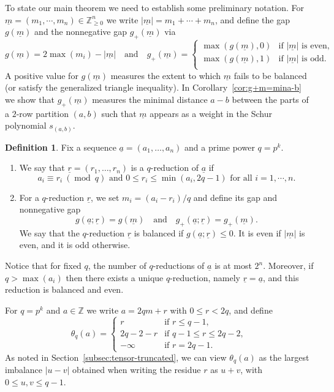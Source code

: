 \documentclass[11pt,reqno]{amsart}
\newcommand{\defi}[1]{{\upshape\sffamily #1}}
\newcommand{\bb}[1]{\mathbb{#1}}
\newcommand{\op}[1]{\operatorname{#1}}
\newcommand{\ul}[1]{\underline{#1}}
\theoremstyle{definition}
\newtheorem{definition}[theorem]{Definition}
\theoremstyle{remark}
\numberwithin{equation}{section}
\begin{document}
To state our main theorem we need to establish some preliminary notation. For $\ul{m}=(m_1,\cdots,m_n)\in\bb{Z}^n_{\geq 0}$ we write $|\ul{m}|=m_1+\cdots+m_n$, and define the \defi{gap $g(\ul{m})$} and the \defi{nonnegative gap $g_+(\ul{m})$} via
\begin{equation}\label{eq:defgap-g+} 
g(\ul{m}) = 2\max(m_i) - |\ul{m}|\quad\text{and}\quad g_+(\ul{m}) = \begin{cases}
\max(g(\ul{m}),0) & \text{if }|\ul{m}|\text{ is even}, \\
\max(g(\ul{m}),1) & \text{if }|\ul{m}|\text{ is odd}. \\
\end{cases}
\end{equation}
A positive value for $g(\ul{m})$ measures the extent to which $\ul{m}$ fails to be balanced (or satisfy the generalized triangle inequality). In Corollary~\ref{cor:g+m=mina-b} we show that $g_+(\ul{m})$ measures the minimal distance $a-b$ between the parts of a $2$-row partition $(a,b)$ such that $\ul{m}$ appears as a weight in the Schur polynomial $s_{(a,b)}$.

\begin{definition}\label{def:reduction+gap}
Fix a sequence $\ul{a}=(a_1,\ldots,a_n)$ and a prime power $q=p^k$.
\begin{enumerate}
    \item We say that $\ul{r}=(r_1,\ldots,r_n)$ is a \defi{$q$-reduction} of $\ul{a}$ if 
    \[a_i\equiv r_i\ (\op{mod}\ q)\text{ and }0\leq r_i\leq\min(a_i,2q-1)\text{ for all }i=1,\cdots,n.\]
    \item For a $q$-reduction $\ul{r}$, we set $m_i = (a_i-r_i)/q$ and define its \defi{gap} and \defi{nonnegative gap}
    \[g(\ul{a};\ul{r}) = g(\ul{m})\quad\text{and}\quad g_+(\ul{a};\ul{r}) = g_+(\ul{m}).\]
    We say that the $q$-reduction $\ul{r}$ is \defi{balanced} if $g(\ul{a};\ul{r})\leq 0$. It is even if $|\ul{m}|$ is even, and it is odd otherwise.
\end{enumerate}
\end{definition}

\noindent Notice that for fixed $q$, the number of $q$-reductions of $\ul{a}$ is at most $2^n$. Moreover, if $q>\max(a_i)$ then there exists a unique $q$-reduction, namely $\ul{r} = \ul{a}$, and this reduction is balanced and even.

For $q=p^k$ and $a\in\bb{Z}$ we write $a = 2qm + r$ with $0\leq r<2q$, and define 
\begin{equation}\label{eq:def-theta-q}
 \theta_q(a) = \begin{cases}
     r & \text{if }r\leq q-1,\\
     2q-2-r & \text{if }q-1\leq r\leq 2q-2,\\
     -\infty & \text{if }r=2q-1.
 \end{cases}
\end{equation}
As noted in Section~\ref{subsec:tensor-truncated}, we can view $\theta_q(a)$ as the largest imbalance $|u-v|$ obtained when writing the residue $r$ as $u+v$, with $0\leq u,v\leq q-1$.
\end{document}
